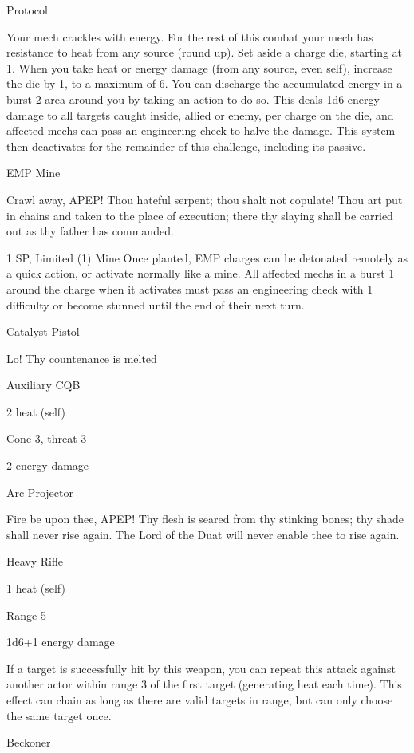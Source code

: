   Protocol
 
 Your mech crackles with energy. For the rest of this combat your mech has resistance to heat from any  
 source (round up). Set aside a charge die, starting at 1. When you take heat or energy damage (from  
 any source, even self), increase the die by 1, to a maximum of 6. You can discharge the accumulated  
 energy in a burst 2 area around you by taking an action to do so. This deals 1d6 energy damage to all  
 targets caught inside, allied or enemy, per charge on the die, and affected mechs can pass an  
 engineering check to halve the damage. This system then deactivates for the remainder of this  
 challenge, including its passive. 

EMP Mine  

Crawl away, APEP! Thou hateful serpent; thou shalt not copulate! Thou art put in chains and taken to the  
place of execution; there thy slaying shall be carried out as thy father has commanded.  

1 SP, Limited (1)  
Mine  
Once planted, EMP charges can be detonated remotely as a quick action, or activate normally  
like a mine. All affected mechs in a burst 1 around the charge when it activates must pass an  
engineering check with 1 difficulty or become stunned until the end of their next turn.
 

Catalyst Pistol
 
Lo! Thy countenance is melted
 
Auxiliary CQB
 
2 heat (self)
 
Cone 3, threat 3
 
2 energy damage
 

Arc Projector  

Fire be upon thee, APEP! Thy flesh is seared from thy stinking bones; thy shade shall never rise again. The  
Lord of the Duat will never enable thee to rise again.  

Heavy Rifle
 
1 heat (self)
 
Range 5
 
1d6+1 energy damage
 
If a target is successfully hit by this weapon, you can repeat this attack against another actor  
within range 3 of the first target (generating heat each time). This effect can chain as long as  
there are valid targets in range, but can only choose the same target once.
 

Beckoner  

                                                                                                                


